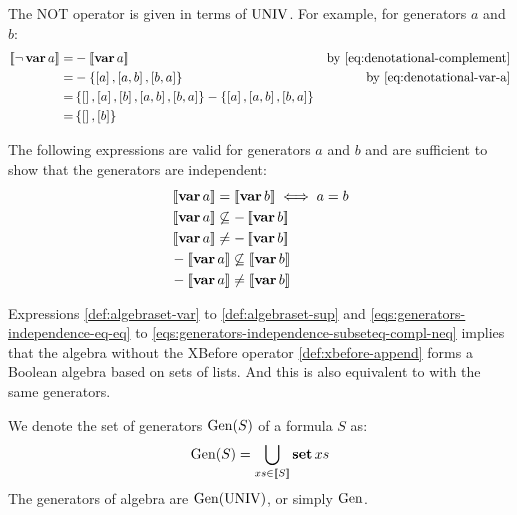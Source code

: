 \documentclass[12pt,openright,twoside,a4paper,oldfontcommands,english,brazil,final]{abntex2}
\theoremstyle{theo}
\def\varop{\ensuremath\operatorname{\mathbf{var}}}
\newcommand{\var}[1]{\ensuremath\varop #1}
\def\True{\ensuremath\operatorname{UNIV}}
\def\listsetop{\ensuremath\operatorname{\mathbf{set}}}
\newcommand{\listset}[1]{\ensuremath\listsetop #1}
\newcommand{\listsin}[1]{\ensuremath\left[ #1 \right]}
\newcommand{\denote}[1]{\ensuremath\left[\!\left[#1\right]\!\right]}
\def\generators{\ensuremath\mathrm{Gen}}
\begin{document}
The \ac{NOT} operator is given in terms of $\True$.
For example, for generators $a$ and $b$:
\begin{align}
\denote{\lnot \var{a}} = & - \denote{\var{a}} & \text{by \cref{eq:denotational-complement}}\nonumber\\
= & - \left\{\listsin{a}, \listsin{a,b}, \listsin{b,a}\right\} & \text{by \cref{eq:denotational-var-a}} \nonumber\\
= & \left\{ \listsin{}, \listsin{a}, \listsin{b}, \listsin{a,b}, \listsin{b,a} \right\} - \left\{\listsin{a}, \listsin{a,b}, \listsin{b,a}\right\} \nonumber\\
= & \left\{\listsin{}, \listsin{b}\right\}
\end{align}

The following expressions are valid for generators $a$ and $b$ and are sufficient to show that the generators are independent:
%
\begin{subequations}
\label{eqs:generators-independence}
\begin{align}
&\denote{\var{a}} = \denote{\var{b}} \iff a = b\label{eqs:generators-independence-eq-eq}\\
&\denote{\var{a}} \not\subseteq - \denote{\var{b}}\\
&\denote{\var{a}} \neq -\denote{\var{b}}\label{eqs:generators-independence-subseteq-neq-compl} \\
&- \denote{\var{a}} \not\subseteq \denote{\var{b}}\\
&- \denote{\var{a}} \neq \denote{\var{b}}\label{eqs:generators-independence-subseteq-compl-neq}
\end{align}
\end{subequations}

Expressions \cref{def:algebraset-var} to \cref{def:algebraset-sup} and \cref{eqs:generators-independence-eq-eq} to \cref{eqs:generators-independence-subseteq-compl-neq} implies that the \ac{algebra} without the \ac{XBefore} operator \cref{def:xbefore-append} forms a Boolean algebra based on sets of lists.
And this is also equivalent to  with the same generators.

We denote the set of generators $\generators(S)$ of a formula $S$ as:
\begin{equation}
\generators(S) = \bigcup_{xs \in \denote{S}} \listset{xs}\label{eq:generators}
\end{equation}
%
The generators of \ac{algebra} are $\generators(\True)$, or simply $\generators$.
\end{document}

